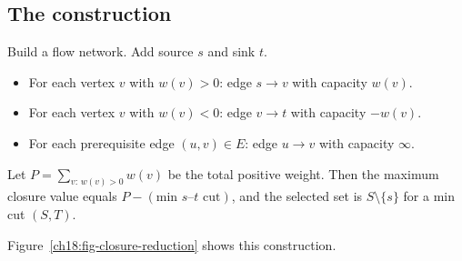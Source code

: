 \subsection{The construction}

\begin{focusbox}
Build a flow network. Add source $s$ and sink $t$.
\begin{itemize}
\item For each vertex $v$ with $w(v) > 0$: edge $s\to v$ with capacity $w(v)$.
\item For each vertex $v$ with $w(v) < 0$: edge $v\to t$ with capacity $-w(v)$.
\item For each prerequisite edge $(u,v)\in E$: edge $u\to v$ with capacity $\infty$.
\end{itemize}
Let $P = \sum_{v:\,w(v)>0} w(v)$ be the total positive weight. Then the maximum closure value equals $P - (\text{min } s\text{--}t\text{ cut})$, and the selected set is $S\setminus\{s\}$ for a min cut $(S,T)$.
\end{focusbox}

Figure~\ref{ch18:fig-closure-reduction} shows this construction.

